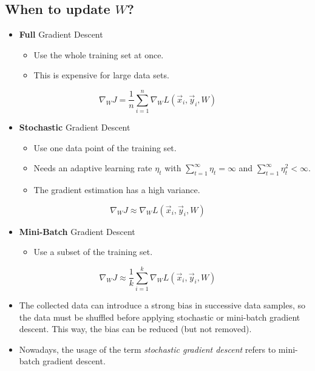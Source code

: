\subsection{When to update \(W\)?}
	\begin{itemize}
		\item \textbf{Full} Gradient Descent
			\begin{itemize}
				\item Use the whole training set at once.
				\item This is expensive for large data sets.
			\end{itemize}
	\end{itemize}
	\begin{equation}
		\nabla_W J = \frac{1}{n} \sum_{i = 1}^{n} \nabla_W L(\vec{x}_i, \vec{y}_i, W)
	\end{equation}
	\begin{itemize}
		\item \textbf{Stochastic} Gradient Descent
			\begin{itemize}
				\item Use one data point of the training set.
				\item Needs an adaptive learning rate \( \eta_t \) with \( \sum_{t = 1}^{\infty} \eta_t = \infty \) and \( \sum_{t = 1}^{\infty} \eta_t^2 < \infty \).
				\item The gradient estimation has a high variance.
			\end{itemize}
	\end{itemize}
	\begin{equation}
		\nabla_W J \approx \nabla_W L(\vec{x}_i, \vec{y}_i, W)
	\end{equation}
	\begin{itemize}
		\item \textbf{Mini-Batch} Gradient Descent
			\begin{itemize}
				\item Use a subset of the training set.
			\end{itemize}
	\end{itemize}
	\begin{equation}
		\nabla_W J \approx \frac{1}{k} \sum_{i = 1}^{k} \nabla_W L(\vec{x}_i, \vec{y}_i, W)
	\end{equation}
	\begin{itemize}
		\item The collected data can introduce a strong bias in successive data samples, so the data must be shuffled before applying stochastic or mini-batch gradient descent. This way, the bias can be reduced (but not removed).
		\item Nowadays, the usage of the term \emph{stochastic gradient descent} refers to mini-batch gradient descent.
	\end{itemize}

